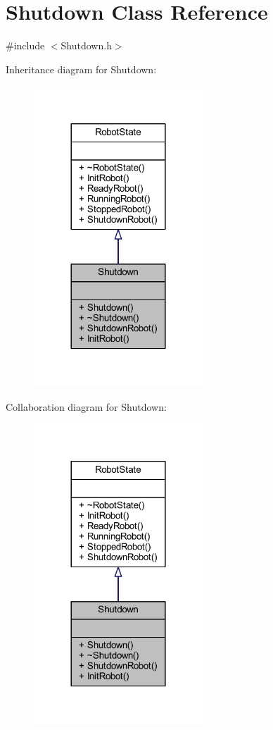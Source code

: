 \hypertarget{class_shutdown}{}\section{Shutdown Class Reference}
\label{class_shutdown}


{\ttfamily \#include $<$Shutdown.\+h$>$}



Inheritance diagram for Shutdown\+:
\nopagebreak
\begin{figure}[H]
\begin{center}
\leavevmode
\includegraphics[width=180pt]{class_shutdown__inherit__graph}
\end{center}
\end{figure}


Collaboration diagram for Shutdown\+:
\nopagebreak
\begin{figure}[H]
\begin{center}
\leavevmode
\includegraphics[width=180pt]{class_shutdown__coll__graph}
\end{center}
\end{figure}
